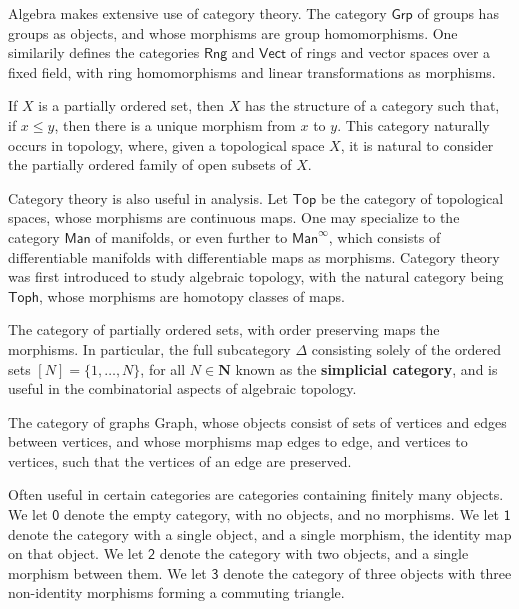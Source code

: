 \begin{example}
    Algebra makes extensive use of category theory. The category $\mathsf{Grp}$ of groups has groups as objects, and whose morphisms are group homomorphisms. One similarily defines the categories $\mathsf{Rng}$ and $\mathsf{Vect}$ of rings and vector spaces over a fixed field, with ring homomorphisms and linear transformations as morphisms.
\end{example}

\begin{example}
    If $X$ is a partially ordered set, then $X$ has the structure of a category such that, if $x \leq y$, then there is a unique morphism from $x$ to $y$. This category naturally occurs in topology, where, given a topological space $X$, it is natural to consider the partially ordered family of open subsets of $X$.
\end{example}

\begin{example}
    Category theory is also useful in analysis. Let $\mathsf{Top}$ be the category of topological spaces, whose morphisms are continuous maps. One may specialize to the category $\mathsf{Man}$ of manifolds, or even further to $\mathsf{Man}^\infty$, which consists of differentiable manifolds with differentiable maps as morphisms. Category theory was first introduced to study algebraic topology, with the natural category being $\mathsf{Toph}$, whose morphisms are homotopy classes of maps.
\end{example}

\begin{example}
    The category of partially ordered sets, with order preserving maps the morphisms. In particular, the full subcategory $\Delta$ consisting solely of the ordered sets $[N] = \{ 1, \dots, N \}$, for all $N \in \mathbf{N}$ known as the {\bf simplicial category}, and is useful in the combinatorial aspects of algebraic topology.
\end{example}

\begin{example}
    The category of graphs {\sf Graph}, whose objects consist of sets of vertices and edges between vertices, and whose morphisms map edges to edge, and vertices to vertices, such that the vertices of an edge are preserved.
\end{example}

\begin{example}
    Often useful in certain categories are categories containing finitely many objects. We let $\mathsf{0}$ denote the empty category, with no objects, and no morphisms. We let $\mathsf{1}$ denote the category with a single object, and a single morphism, the identity map on that object. We let $\mathsf{2}$ denote the category with two objects, and a single morphism between them. We let $\mathsf{3}$ denote the category of three objects with three non-identity morphisms forming a commuting triangle.
\end{example}


